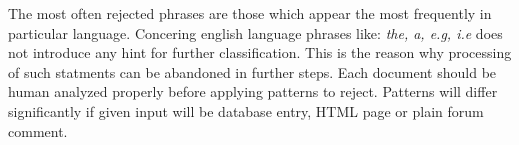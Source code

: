 The most often rejected phrases are those which appear the most frequently in particular language. Concering english language phrases like: \textit{the, a, e.g, i.e} does not introduce any hint for further classification. This is the reason why processing of such statments can be abandoned in further steps. Each document should be human analyzed properly before applying patterns to reject. Patterns will differ significantly if given input will be database entry, HTML page or plain forum comment. 



 